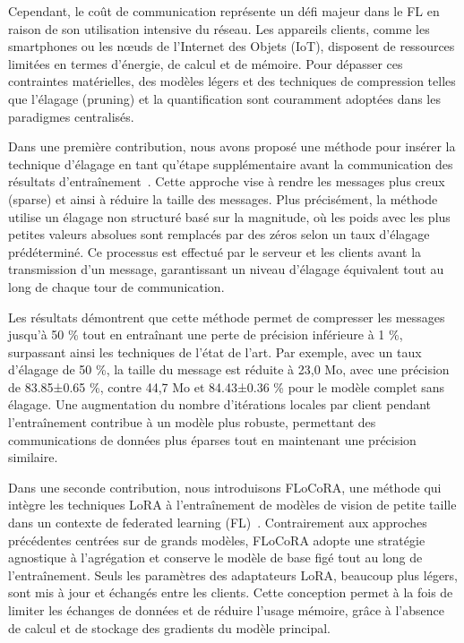 \documentclass[11pt]{report}
\begin{document}
Cependant, le coût de communication représente un défi majeur dans le FL en raison de son utilisation intensive du réseau. Les appareils clients, comme les smartphones ou les nœuds de l'Internet des Objets (IoT), disposent de ressources limitées en termes d'énergie, de calcul et de mémoire. Pour dépasser ces contraintes matérielles, des modèles légers et des techniques de compression telles que l'élagage (pruning) et la quantification sont couramment adoptées dans les paradigmes centralisés.

Dans une première contribution, nous avons proposé une méthode pour insérer la technique d'élagage en tant qu'étape supplémentaire avant la communication des résultats d'entraînement~\cite{grativol:hal-04251969,grativol:emse-04217775}. Cette approche vise à rendre les messages plus creux (sparse) et ainsi à réduire la taille des messages. Plus précisément, la méthode utilise un élagage non structuré basé sur la magnitude, où les poids avec les plus petites valeurs absolues sont remplacés par des zéros selon un taux d'élagage prédéterminé. Ce processus est effectué par le serveur et les clients avant la transmission d'un message, garantissant un niveau d'élagage équivalent tout au long de chaque tour de communication.

Les résultats démontrent que cette méthode permet de compresser les messages jusqu'à 50 \% tout en entraînant une perte de précision inférieure à 1 \%, surpassant ainsi les techniques de l'état de l'art. Par exemple, avec un taux d'élagage de 50 \%, la taille du message est réduite à 23,0 Mo, avec une précision de 83.85±0.65 \%, contre 44,7 Mo et 84.43±0.36 \% pour le modèle complet sans élagage. Une augmentation du nombre d'itérations locales par client pendant l'entraînement contribue à un modèle plus robuste, permettant des communications de données plus éparses tout en maintenant une précision similaire.

Dans une seconde contribution, nous introduisons FLoCoRA, une méthode qui intègre les techniques LoRA à l'entraînement de modèles de vision de petite taille dans un contexte de federated learning (FL)~\cite{grativol:hal-04617632}. Contrairement aux approches précédentes centrées sur de grands modèles, FLoCoRA adopte une stratégie agnostique à l'agrégation et conserve le modèle de base figé tout au long de l'entraînement. Seuls les paramètres des adaptateurs LoRA, beaucoup plus légers, sont mis à jour et échangés entre les clients. Cette conception permet à la fois de limiter les échanges de données et de réduire l'usage mémoire, grâce à l'absence de calcul et de stockage des gradients du modèle principal.
\end{document}
